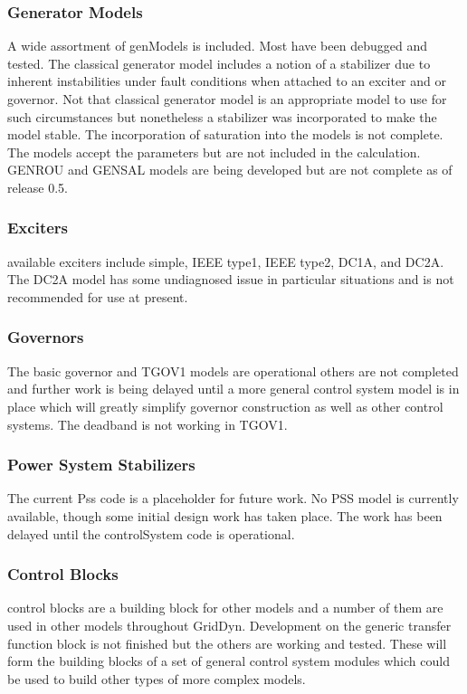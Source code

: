 \documentclass[12pt]{article} %
\begin{document}
\subsubsection{Generator Models}
A wide assortment of genModels is included.  Most have been debugged and tested.  The classical generator model includes a notion of a stabilizer due to inherent instabilities under fault conditions when attached to an exciter and or governor.  Not that classical generator model is an appropriate model to use for such circumstances but nonetheless a stabilizer was incorporated to make the model stable.  The incorporation of saturation into the models is not complete.  The models accept the parameters but are not included in the calculation.  GENROU and GENSAL models are being developed but are not complete as of release 0.5.  

\subsubsection{Exciters}
available exciters include simple, IEEE type1,  IEEE type2, DC1A, and DC2A.  The DC2A model has some undiagnosed issue in particular situations and is not recommended for use at present.  

\subsubsection{Governors}  
The basic governor and TGOV1 models are operational others are not completed and further work is being delayed until a more general control system model is in place which will greatly simplify governor construction as well as other control systems.  The deadband is not working in TGOV1.  

\subsubsection{Power System Stabilizers} 
The current Pss code is a placeholder for future work.  No PSS model is currently available, though some initial design work has taken place.  The work has been delayed until the controlSystem code is operational.

\subsubsection{Control Blocks}
control blocks are a building block for other models and a number of them are used in other models throughout GridDyn.  
Development on the generic transfer function block is not finished but the others are working and tested.  These will form the building blocks of a set of general control system modules which could be used to build other types of more complex models.
\end{document}
